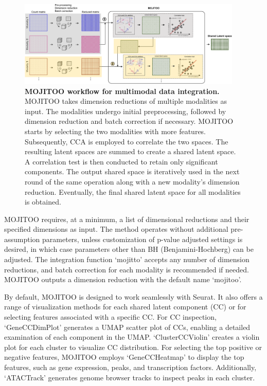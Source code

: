 \begin{figure}[!ht]
	\centering
	\includegraphics[width=0.95\textwidth]{MOJITOO_schematic/fig}
	\vspace{0.1cm}
	\caption[MOJITOO workflow for multimodal data integration.]{\textbf{MOJITOO workflow for multimodal data integration.} MOJITOO takes dimension reductions of multiple modalities as input. The modalities undergo initial preprocessing, followed by dimension reduction and batch correction if necessary. MOJITOO starts by selecting the two modalities with more features. Subsequently, CCA is employed to correlate the two spaces. The resulting latent spaces are summed to create a shared latent space. A correlation test is then conducted to retain only significant components. The output shared space is iteratively used in the next round of the same operation along with a new modality's dimension reduction. Eventually, the final shared latent space for all modalities is obtained.}
	\label{fig:MOJITOO_schematic}
\end{figure}

MOJITOO requires, at a minimum, a list of dimensional reductions and their specified dimensions as input. The method operates without additional pre-assumption parameters, unless customization of p-value adjusted settings is desired, in which case parameters other than BH (Benjamini-Hochberg) can be adjusted. The integration function `mojitto' accepts any number of dimension reductions, and batch correction for each modality is recommended if needed. MOJITOO outputs a dimension reduction with the default name `mojitoo'.

By default, MOJITOO is designed to work seamlessly with Seurat. It also offers a range of visualization methods for each shared latent component (CC) or for selecting features associated with a specific CC. For CC inspection, `GeneCCDimPlot' generates a UMAP scatter plot of CCs, enabling a detailed examination of each component in the UMAP. `ClusterCCViolin' creates a violin plot for each cluster to visualize CC distribution. For selecting the top positive or negative features, MOJITOO employs `GeneCCHeatmap' to display the top features, such as gene expression, peaks, and transcription factors. Additionally, `ATACTrack' generates genome browser tracks to inspect peaks in each cluster.

